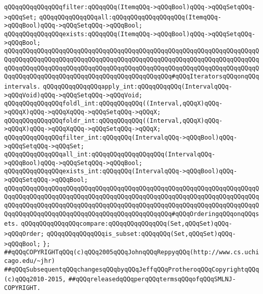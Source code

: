 \verb|qQQqqQQqqQQqqQQqfilter:qQQqqQQq(ItemqQQq->qQQqBool)qQQq->qQQqSetqQQq->qQQqSet;|\newline
\verb|qQQqqQQqqQQqqQQqall:qQQqqQQqqQQqqQQqqQQq(ItemqQQq->qQQqBool)qQQq->qQQqSetqQQq->qQQqBool;|\newline
\verb|qQQqqQQqqQQqqQQqexists:qQQqqQQq(ItemqQQq->qQQqBool)qQQq->qQQqSetqQQq->qQQqBool;|\newline
\newline
\verb|qQQqqQQqqQQqqQQqqQQqqQQqqQQqqQQqqQQqqQQqqQQqqQQqqQQqqQQqqQQqqQQqqQQqqQQqqQQqqQQqqQQqqQQqqQQqqQQqqQQqqQQqqQQqqQQqqQQqqQQqqQQqqQQqqQQqqQQqqQQqqQQqqQQqqQQqqQQqqQQqqQQqqQQqqQQqqQQqqQQqqQQqqQQqqQQqqQQqqQQqqQQqqQQqqQQqqQQqqQQqqQQqqQQqqQQqqQQqqQQqqQQqqQQqqQQqqQQq#qQQqIteratorsqQQqonqQQqintervals.|\newline
\verb|qQQqqQQqqQQqqQQqapply_int:qQQqqQQqqQQq(IntervalqQQq->qQQqVoid)qQQq->qQQqSetqQQq->qQQqVoid;|\newline
\verb|qQQqqQQqqQQqqQQqfoldl_int:qQQqqQQqqQQq((Interval,qQQqX)qQQq->qQQqX)qQQq->qQQqXqQQq->qQQqSetqQQq->qQQqX;|\newline
\verb|qQQqqQQqqQQqqQQqfoldr_int:qQQqqQQqqQQq((Interval,qQQqX)qQQq->qQQqX)qQQq->qQQqXqQQq->qQQqSetqQQq->qQQqX;|\newline
\verb|qQQqqQQqqQQqqQQqfilter_int:qQQqqQQq(IntervalqQQq->qQQqBool)qQQq->qQQqSetqQQq->qQQqSet;|\newline
\verb|qQQqqQQqqQQqqQQqall_int:qQQqqQQqqQQqqQQqqQQq(IntervalqQQq->qQQqBool)qQQq->qQQqSetqQQq->qQQqBool;|\newline
\verb|qQQqqQQqqQQqqQQqexists_int:qQQqqQQq(IntervalqQQq->qQQqBool)qQQq->qQQqSetqQQq->qQQqBool;|\newline
\newline
\verb|qQQqqQQqqQQqqQQqqQQqqQQqqQQqqQQqqQQqqQQqqQQqqQQqqQQqqQQqqQQqqQQqqQQqqQQqqQQqqQQqqQQqqQQqqQQqqQQqqQQqqQQqqQQqqQQqqQQqqQQqqQQqqQQqqQQqqQQqqQQqqQQqqQQqqQQqqQQqqQQqqQQqqQQqqQQqqQQqqQQqqQQqqQQqqQQqqQQqqQQqqQQqqQQqqQQqqQQqqQQqqQQqqQQqqQQqqQQqqQQqqQQqqQQqqQQqqQQq#qQQqOrderingqQQqonqQQqsets.|\newline
\verb|qQQqqQQqqQQqqQQqcompare:qQQqqQQqqQQqqQQq(Set,qQQqSet)qQQq->qQQqOrder;|\newline
\verb|qQQqqQQqqQQqqQQqis_subset:qQQqqQQq(Set,qQQqSet)qQQq->qQQqBool;|\newline
\verb|};|\newline
\newline
\newline
\verb|##qQQqCOPYRIGHTqQQq(c)qQQq2005qQQqJohnqQQqReppyqQQq(http://www.cs.uchicago.edu/~jhr)|\newline
\verb|##qQQqSubsequentqQQqchangesqQQqbyqQQqJeffqQQqProtheroqQQqCopyrightqQQq(c)qQQq2010-2015,|\newline
\verb|##qQQqreleasedqQQqperqQQqtermsqQQqofqQQqSMLNJ-COPYRIGHT.|\newline

